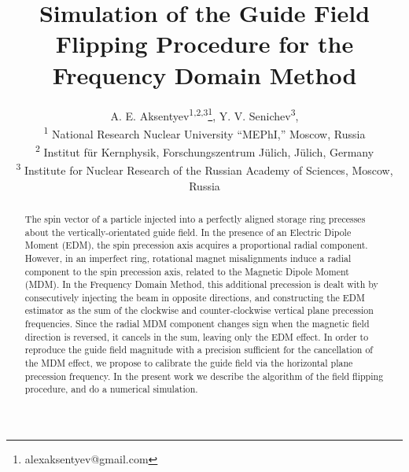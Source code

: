 \documentclass[a4paper]{jacow}
\begin{document}
\title{Simulation of the Guide Field Flipping Procedure for the Frequency Domain Method}
\author{A. E. Aksentyev\textsuperscript{1,2,3}\thanks{alexaksentyev@gmail.com},
  Y. V. Senichev\textsuperscript{3}, \\
  \textsuperscript{1} National Research Nuclear University ``MEPhI,'' Moscow, Russia \\
  \textsuperscript{2} Institut f\"ur Kernphysik, Forschungszentrum J\"ulich, J\"ulich, Germany\\
  \textsuperscript{3} Institute for Nuclear Research of the Russian Academy of Sciences, Moscow, Russia}
\maketitle

\begin{abstract}
  The spin vector of a particle injected into a perfectly aligned storage ring precesses about
  the vertically-orientated guide field. In the presence of an Electric Dipole Moment (EDM),
  the spin precession axis acquires a proportional radial component.
  However, in an imperfect ring, rotational magnet misalignments induce a radial component
  to the spin precession axis, related to the Magnetic Dipole Moment (MDM). In the Frequency Domain Method,
  this additional precession is dealt with by consecutively injecting the beam in opposite directions,
  and constructing the EDM estimator as the sum of the clockwise and counter-clockwise
  vertical plane precession frequencies. Since the radial MDM component changes sign
  when the magnetic field direction is reversed, it cancels in the sum, leaving only the EDM effect. 
  In order to reproduce the guide field magnitude with a precision sufficient for
  the cancellation of the MDM effect, we propose to calibrate the guide field via
  the horizontal plane precession frequency. In the present work we describe the algorithm of
  the field flipping procedure, and do a numerical simulation.
\end{abstract}
\end{document}
